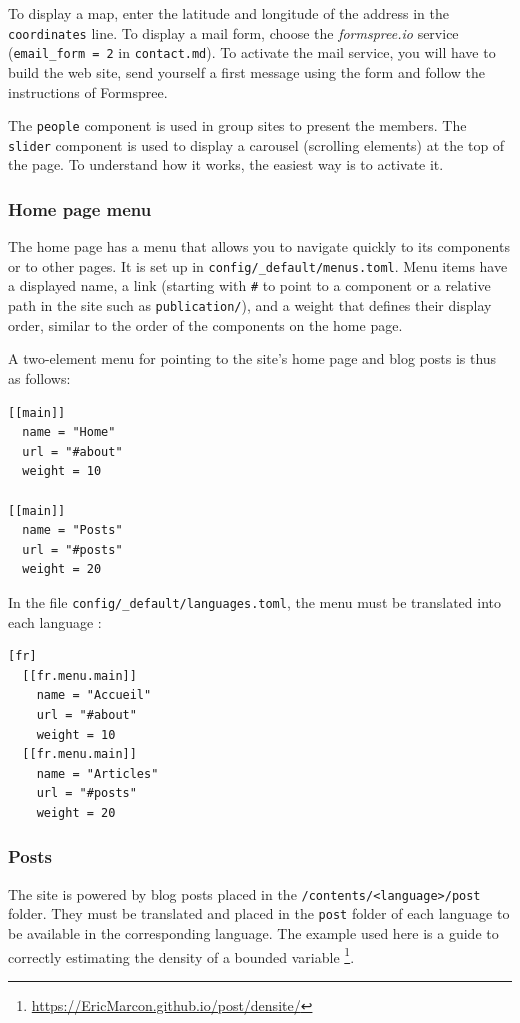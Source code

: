 \documentclass[
  12pt,
  american,
  a4paper,
  extrafontsizes,onecolumn,openright
  ]{memoir}
\begin{document}
To display a map, enter the latitude and longitude of the address in the \texttt{coordinates} line.
To display a mail form, choose the \emph{formspree.io} service (\texttt{email\_form\ =\ 2} in \texttt{contact.md}).
To activate the mail service, you will have to build the web site, send yourself a first message using the form and follow the instructions of Formspree.

The \texttt{people} component is used in group sites to present the members.
The \texttt{slider} component is used to display a carousel (scrolling elements) at the top of the page.
To understand how it works, the easiest way is to activate it.

\subsubsection{Home page menu}\label{home-page-menu}

The home page has a menu that allows you to navigate quickly to its components or to other pages.
It is set up in \texttt{config/\_default/menus.toml}.
Menu items have a displayed name, a link (starting with \texttt{\#} to point to a component or a relative path in the site such as \texttt{publication/}), and a weight that defines their display order, similar to the order of the components on the home page.

A two-element menu for pointing to the site's home page and blog posts is thus as follows:

\begin{verbatim}
[[main]]
  name = "Home"
  url = "#about"
  weight = 10

[[main]]
  name = "Posts"
  url = "#posts"
  weight = 20
\end{verbatim}

In the file \texttt{config/\_default/languages.toml}, the menu must be translated into each language :

\begin{verbatim}
[fr]
  [[fr.menu.main]]
    name = "Accueil"
    url = "#about"
    weight = 10
  [[fr.menu.main]]
    name = "Articles"
    url = "#posts"
    weight = 20
\end{verbatim}

\subsubsection{Posts}\label{posts}

The site is powered by blog posts placed in the \texttt{/contents/\textless{}language\textgreater{}/post} folder.
They must be translated and placed in the \texttt{post} folder of each language to be available in the corresponding language.
The example used here is a guide to correctly estimating the density of a bounded variable \footnote{\url{https://EricMarcon.github.io/post/densite/}}.
\end{document}
